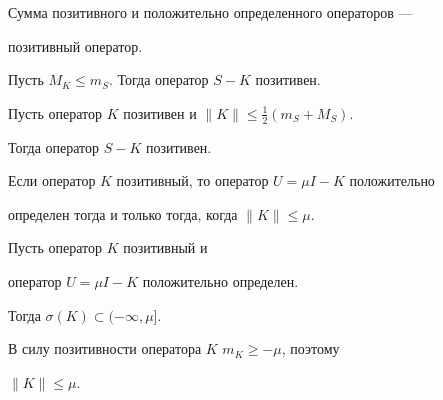 \begin{cor}


Сумма позитивного и положительно определенного операторов ---


позитивный оператор.


\end{cor}





\begin{cor}


Пусть $M_K\le m_S$. Тогда оператор $S-K$ позитивен.


\end{cor}





\begin{cor}


Пусть оператор $K$ позитивен и $\|K\|\le\frac12(m_S+M_S)$.


Тогда оператор $S-K$ позитивен.


\end{cor}





\begin{thm}


Если оператор $K$ позитивный, то оператор $U=\mu I-K$ положительно


определен тогда и только тогда, когда $\|K\|\le\mu$.


\end{thm}





\begin{pf}


Пусть оператор $K$ позитивный и


оператор $U=\mu I-K$ положительно определен.


Тогда $\sigma(K)\subset(-\infty,\mu]$.


В силу позитивности оператора $K$ $m_K\ge-\mu$, поэтому\linebreak


$\|K\|\le\mu$.


\end{pf}





